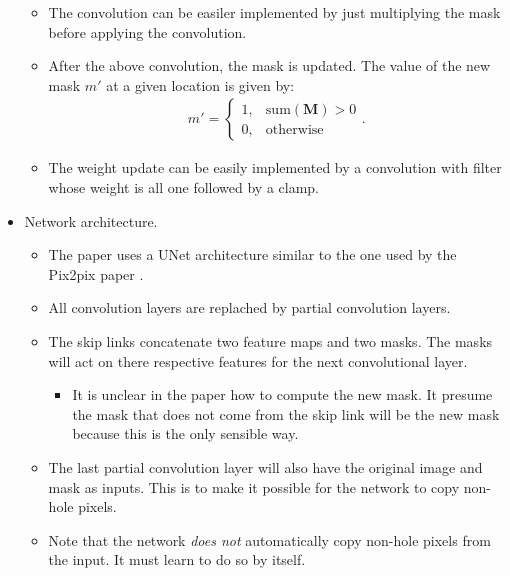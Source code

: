 \documentclass[10pt]{article}
\newcommand{\ve}[1]{\mathbf{#1}}
\begin{document}
\begin{itemize}
\begin{itemize}
      \item The convolution can be easiler implemented by just multiplying the mask before applying the convolution.
      
      \item After the above convolution, the mask is updated. The value of the new mask $m'$ at a given location is given by:
      \begin{align*}
        m' = \begin{cases}
          1, & \mathrm{sum}(\ve{M}) > 0 \\
          0, & \mathrm{otherwise}
        \end{cases}.
      \end{align*}

      \item The weight update can be easily implemented by a convolution with filter whose weight is all one followed by a clamp.
    \end{itemize}

    \item Network architecture.
    \begin{itemize}
      \item The paper uses a UNet architecture similar to the one used by the Pix2pix paper \cite{Isola:2016}.

      \item All convolution layers are replached by partial convolution layers.

      \item The skip links concatenate two feature maps and two masks. The masks will act on there respective features for the next convolutional layer.
      \begin{itemize}
        \item It is unclear in the paper how to compute the new mask. It presume the mask that does not come from the skip link will be the new mask because this is the only sensible way.
      \end{itemize}

      \item The last partial convolution layer will also have the original image and mask as inputs. This is to make it possible for the network to copy non-hole pixels.

      \item Note that the network \emph{does not} automatically copy non-hole pixels from the input. It must learn to do so by itself.
    \end{itemize}


\end{itemize}
\end{document}
